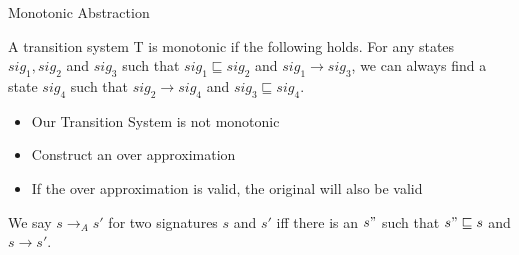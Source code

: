 \begin{frame}[fragile]{Monotonic Abstraction}
    
    \pause

    \begin{definition}

        A transition system T is monotonic if the following holds. For any states $sig_1, sig_2$ and $sig_3$ such that
        $sig_1 \sqsubseteq sig_2$ and $sig_1 \longrightarrow sig_3$, we can always find a state $sig_4$ such that $sig_2 \longrightarrow sig_4$
        and $sig_3 \sqsubseteq sig_4$.
    \end{definition}

    \begin{itemize}
        \item <3-> Our Transition System is not monotonic
        \item <4-> Construct an over approximation
        \item <5-> If the over approximation is valid, the original will also be valid
    \end{itemize}

    \pause
    \pause
    \pause
    \pause

    \begin{definition}

        We say $s \longrightarrow_A s'$ for two signatures $s$ and $s'$ iff there is an $s"$ such that $s" \sqsubseteq s$ and
        $s \longrightarrow s'$. 
    \end{definition}

\end{frame}